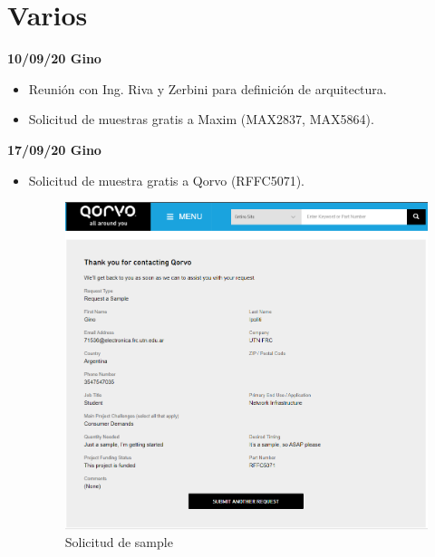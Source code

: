 \documentclass[a4paper,12pt]{report} %
\begin{document}
\chapter*{Varios}

\textbf{10/09/20 Gino}
\begin{itemize}
	\item Reunión con Ing. Riva y Zerbini para definición de arquitectura.
	\item Solicitud de muestras gratis a Maxim (MAX2837, MAX5864).
\end{itemize}
\textbf{17/09/20 Gino}
\begin{itemize}
	\item Solicitud de muestra gratis a Qorvo (RFFC5071).
	\begin{figure}[H]
		\centering
		\includegraphics[scale=0.6]{Imagenes/sample_qorvo}
		\caption{Solicitud de sample}
	\end{figure}
\end{itemize}

	

\nocite{*}
\end{document}
